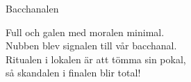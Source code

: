 \begin{song}{Bacchanalen}
	
	
	
	
	Full och galen med moralen minimal.\\
	Nubben blev signalen till vår bacchanal.\\
	Ritualen i lokalen är att tömma sin pokal,\\
	så skandalen i finalen blir total!
	
\end{song}

